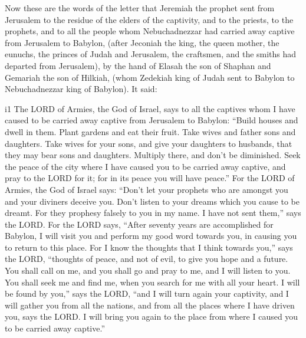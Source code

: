  Now these are the words of the letter that Jeremiah the
prophet sent from Jerusalem to the residue of the elders of the
captivity, and to the priests, to the prophets, and to all the people
whom Nebuchadnezzar had carried away captive from Jerusalem to Babylon,
 (after Jeconiah the king, the queen mother, the eunuchs,
the princes of Judah and Jerusalem, the craftsmen, and the smiths had
departed from Jerusalem),  by the hand of Elasah the son
of Shaphan and Gemariah the son of Hilkiah, (whom Zedekiah king of Judah
sent to Babylon to Nebuchadnezzar king of Babylon). It said:

i1 The LORD of Armies, the God of Israel, says to all the
captives whom I have caused to be carried away captive from Jerusalem to
Babylon:  ``Build houses and dwell in them. Plant gardens
and eat their fruit.  Take wives and father sons and
daughters. Take wives for your sons, and give your daughters to
husbands, that they may bear sons and daughters. Multiply there, and
don't be diminished.  Seek the peace of the city where I
have caused you to be carried away captive, and pray to the LORD for it;
for in its peace you will have peace.''  For the LORD of
Armies, the God of Israel says: ``Don't let your prophets who are
amongst you and your diviners deceive you. Don't listen to your dreams
which you cause to be dreamt.  For they prophesy falsely
to you in my name. I have not sent them,'' says the LORD.
 For the LORD says, ``After seventy years are
accomplished for Babylon, I will visit you and perform my good word
towards you, in causing you to return to this place.  For
I know the thoughts that I think towards you,'' says the LORD,
``thoughts of peace, and not of evil, to give you hope and a future.
 You shall call on me, and you shall go and pray to me,
and I will listen to you.  You shall seek me and find me,
when you search for me with all your heart.  I will be
found by you,'' says the LORD, ``and I will turn again your captivity,
and I will gather you from all the nations, and from all the places
where I have driven you, says the LORD. I will bring you again to the
place from where I caused you to be carried away captive.''


